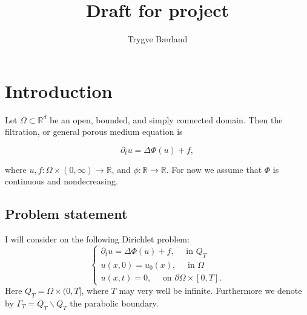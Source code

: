 \documentclass[11pt, a4paper]{article}
\begin{document}
\title{Draft for project}
\author{Trygve Bærland}
\maketitle
{}

\theoremstyle{plain}
\newtheorem{theorem}{Theorem}[section]
\newtheorem{proposition}{Proposition}[section]
\newtheorem{cor}{Corollary}[section]
\newtheorem{lemma}{Lemma}[section]

\theoremstyle{definition}
\newtheorem{mydef}{Definition}[section]
\newtheorem{example}{Example}[section]

\newtheorem{obs}{Observation}
\newtheorem{rem}{Remark}


\section{Introduction}

Let $\Omega \subset \mathbb{R}^d$ be an open, bounded, and simply connected domain. Then the filtration, or general porous medium equation is

\begin{equation}
\label{GPME}
	\partial_t u = \Delta \Phi(u) + f,
\end{equation}

 where $u, f: \Omega \times (0,\infty) \to \mathbb{R}$, and $\phi: \mathbb{R} \to \mathbb{R}$. For now we assume that $\Phi$ is continuous and nondecreasing.


\subsection{Problem statement}
I will consider on the following Dirichlet problem:
\begin{equation}
\label{HDP}
	\begin{cases}
		\partial_t u = \Delta \Phi(u) + f, \quad \text{ in } Q_T \\
		u(x,0) = u_0(x), \quad \text{ in } \Omega \\
		u(x,t) = 0, \quad \text{ on } \partial\Omega \times [0,T].
	\end{cases}
\end{equation}
Here $Q_T = \Omega \times (0,T]$, where $T$ may very well be infinite. Furthermore we denote by $\Gamma_T = \overline{Q}_T\backslash Q_T$ the parabolic boundary.
\end{document}

